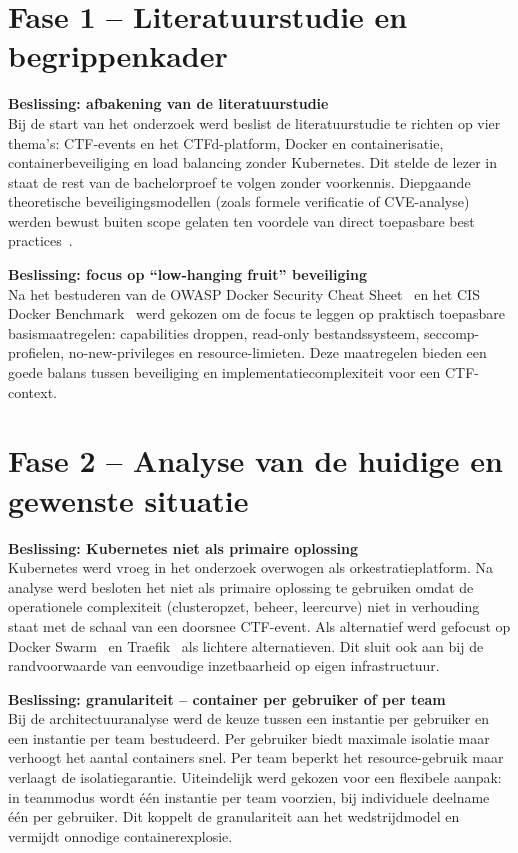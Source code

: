 \documentclass[dutch,dit,thesis]{hogentreport}
\begin{document}
\section*{Fase 1 -- Literatuurstudie en begrippenkader}

\textbf{Beslissing: afbakening van de literatuurstudie}\\
Bij de start van het onderzoek werd beslist de literatuurstudie te richten op vier thema's: CTF-events en het CTFd-platform, Docker en containerisatie, containerbeveiliging en load balancing zonder Kubernetes. Dit stelde de lezer in staat de rest van de bachelorproef te volgen zonder voorkennis. Diepgaande theoretische beveiligingsmodellen (zoals formele verificatie of CVE-analyse) werden bewust buiten scope gelaten ten voordele van direct toepasbare best practices~\autocite{OWASP2024,CISDocker}.

\textbf{Beslissing: focus op ``low-hanging fruit'' beveiliging}\\
Na het bestuderen van de OWASP Docker Security Cheat Sheet~\autocite{OWASP2024} en het CIS Docker Benchmark~\autocite{CISDocker} werd gekozen om de focus te leggen op praktisch toepasbare basismaatregelen: capabilities droppen, read-only bestandssysteem, seccomp-profielen, no-new-privileges en resource-limieten. Deze maatregelen bieden een goede balans tussen beveiliging en implementatiecomplexiteit voor een CTF-context.

\section*{Fase 2 -- Analyse van de huidige en gewenste situatie}

\textbf{Beslissing: Kubernetes niet als primaire oplossing}\\
Kubernetes werd vroeg in het onderzoek overwogen als orkestratieplatform. Na analyse werd besloten het niet als primaire oplossing te gebruiken omdat de operationele complexiteit (clusteropzet, beheer, leercurve) niet in verhouding staat met de schaal van een doorsnee CTF-event. Als alternatief werd gefocust op Docker Swarm~\autocite{DockerSwarm} en Traefik~\autocite{Traefik} als lichtere alternatieven. Dit sluit ook aan bij de randvoorwaarde van eenvoudige inzetbaarheid op eigen infrastructuur.

\textbf{Beslissing: granulariteit -- container per gebruiker of per team}\\
Bij de architectuuranalyse werd de keuze tussen een instantie per gebruiker en een instantie per team bestudeerd. Per gebruiker biedt maximale isolatie maar verhoogt het aantal containers snel. Per team beperkt het resource-gebruik maar verlaagt de isolatiegarantie. Uiteindelijk werd gekozen voor een flexibele aanpak: in teammodus wordt één instantie per team voorzien, bij individuele deelname één per gebruiker. Dit koppelt de granulariteit aan het wedstrijdmodel en vermijdt onnodige containerexplosie.
\end{document}
